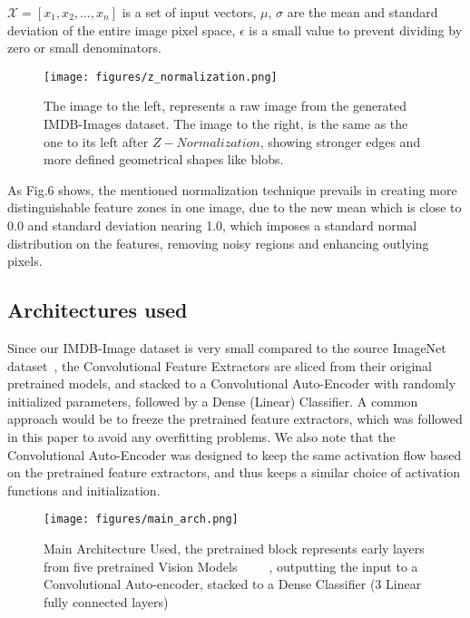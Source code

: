\documentclass[conference]{IEEEtran}
\begin{document}
				$\mathcal{X} = [x_{1}, x_{2}, ... , x_{n}]$ is a set of input vectors,
				$\mu$, $\sigma$ are the mean and standard deviation of the entire image pixel space, 
				$\epsilon$ is a small value to prevent dividing by zero or small denominators.
				
				\begin{figure}[htbp]
                \centerline{\texttt{[image: figures/z\_normalization.png]}}
                \caption{The image to the left, represents a raw image from the generated IMDB-Images dataset. The image to the right, is the same as the one to its left after $Z-Normalization$, showing stronger edges and more defined geometrical shapes like blobs.}
                \label{figure-4}
                \end{figure}
                
                As Fig.6 shows, the mentioned normalization technique prevails in creating more distinguishable feature zones
                in one image, due to the new mean which is close to 0.0 and standard deviation nearing 1.0, which imposes a standard normal distribution on the features, removing noisy regions and enhancing outlying pixels.
                
                
\subsection{Architectures used}

                Since our IMDB-Image dataset is very small compared to the source 
				ImageNet dataset~\cite{imagenet}, the Convolutional Feature Extractors are sliced from their original pretrained models, and stacked to a Convolutional Auto-Encoder with randomly initialized parameters, followed by a Dense (Linear) Classifier. A common approach would be to freeze the pretrained feature extractors, which was followed in this paper to avoid any overfitting problems. We also note that the Convolutional Auto-Encoder was designed to keep the same activation flow based on the pretrained feature extractors, and thus keeps a similar choice of activation functions and initialization.
                
                \begin{figure}[htbp]
                \centerline{\texttt{[image: figures/main\_arch.png]}}
                \caption{Main Architecture Used, the pretrained block represents early layers from five pretrained Vision Models~\cite{alexnet}~\cite{shufflenetv2}~\cite{vgg16}~\cite{resnet}~\cite{resnext}, outputting the input to a Convolutional Auto-encoder, stacked to a Dense Classifier (3 Linear fully connected layers)}
                \label{figure-5}
                \end{figure}
                
\end{document}
